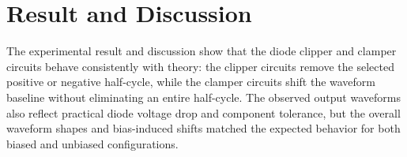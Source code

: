 \section{Result and Discussion}

The experimental result and discussion show that the diode clipper and clamper circuits behave consistently with theory: the clipper circuits remove the selected positive or negative half-cycle, while the clamper circuits shift the waveform baseline without eliminating an entire half-cycle. The observed output waveforms also reflect practical diode voltage drop and component tolerance, but the overall waveform shapes and bias-induced shifts matched the expected behavior for both biased and unbiased configurations.

